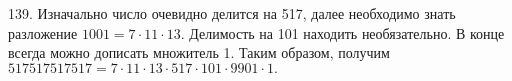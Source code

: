 139. Изначально число очевидно делится на 517, далее необходимо знать разложение $1001=7\cdot11\cdot13.$ Делимость на 101 находить необязательно. В конце всегда можно дописать множитель 1. Таким образом, получим $517517517517=7\cdot11\cdot13\cdot517\cdot101\cdot9901\cdot1.$\\
